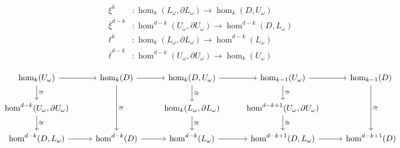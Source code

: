 
\begin{align*}
    \xi^k &: \hom_k(L_\omega, \partial L_\omega)\to \hom_k(D, U_\omega)\\
    \overline{\xi}^{d-k} &: \hom^{d-k}(U_\omega, \partial U_\omega)\to \hom^{d-k}(D, L_\omega)\\
    \ell^k &: \hom_k(L_\omega, \partial L_\omega)\to \hom^{d-k}(L_\omega)\\
    \overline{\ell}^{d-k} &: \hom^{d-k}(U_\omega, \partial U_\omega)\to \hom_k(U_\omega)
\end{align*}

\begin{equation}\begin{tikzcd}
    \hom_k(U_\omega)\arrow{r}\arrow{d}{\cong} &
    \hom_k(D)\arrow{r}\arrow{dd}{\cong} & %
    \hom_k(D, U_\omega)\arrow{r}\arrow{d}{\cong} &
    \hom_{k-1}(U_\omega)\arrow{r}\arrow{d}{\cong} &
    \hom_{k-1}(D)\arrow{dd}{\cong} \\%
    \hom^{d-k}(U_\omega, \partial U_\omega)\arrow{d}{\cong} &
    & \hom_k(L_\omega, \partial L_\omega)\arrow{d}{\cong} &
    \hom^{d-k+1}(U_\omega, \partial U_\omega)\arrow{d}{\cong} & \\
    \hom^{d-k}(D, L_\omega)\arrow{r} &
    \hom^{d-k}(D)\arrow{r} &
    \hom^{d-k}(L_\omega)\arrow{r} &
    \hom^{d-k+1}(D, L_\omega)\arrow{r} &
    \hom^{d-k+1}(D)
\end{tikzcd}\end{equation}
